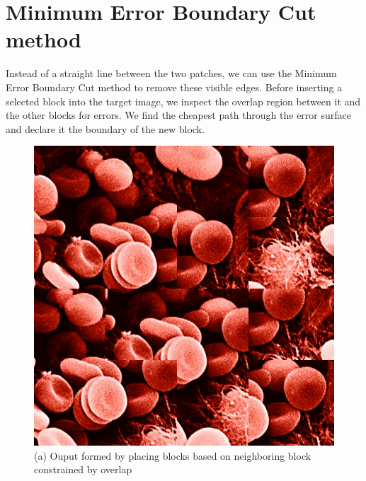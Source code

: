\documentclass[12pt,a4paper]{report}
\begin{document}
\section{Minimum Error Boundary Cut method}
Instead of a straight line between the two patches, we can use the Minimum Error Boundary Cut method to remove these visible edges. Before inserting a selected block into the target image, we inspect the overlap region between it and the other blocks for errors. We find the cheapest path through the error surface and declare it the boundary of the new block.
\newline 
\begin{figure}[H]

  \centering
  \includegraphics[scale=0.23]{pics/rbc_best.png}
    \caption*{(a) Ouput formed by placing blocks based on neighboring block constrained by overlap}
  \endminipage\hspace*{0.5cm}
  \centering

\end{figure}
\end{document}
